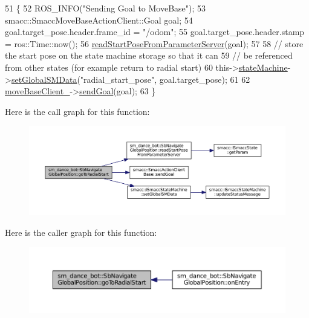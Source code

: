 \begin{DoxyCode}
51   \{
52     ROS\_INFO(\textcolor{stringliteral}{"Sending Goal to MoveBase"});
53     smacc::SmaccMoveBaseActionClient::Goal goal;
54     goal.target\_pose.header.frame\_id = \textcolor{stringliteral}{"/odom"};
55     goal.target\_pose.header.stamp = ros::Time::now();
56     \hyperlink{classsm__dance__bot_1_1SbNavigateGlobalPosition_adc268e278b7de844202959036f424a91}{readStartPoseFromParameterServer}(goal);
57 
58     \textcolor{comment}{// store the start pose on the state machine storage so that it can}
59     \textcolor{comment}{// be referenced from other states (for example return to radial start)}
60     this->\hyperlink{classsmacc_1_1SmaccSubStateBehavior_ae3ff8a316bdd4bc5b7fee59d19464609}{stateMachine}->\hyperlink{classsmacc_1_1ISmaccStateMachine_a8588f9e580fbb95b53e2bd2ca3ff1f98}{setGlobalSMData}(\textcolor{stringliteral}{"radial\_start\_pose"}, goal.target\_pose);
61 
62     \hyperlink{classsm__dance__bot_1_1SbNavigateGlobalPosition_a61ddf443ec0ccc460ae594d35c50ac7f}{moveBaseClient\_}->\hyperlink{classsmacc_1_1SmaccActionClientBase_a2ec9e5fb96ecc517a815cda209eb1b51}{sendGoal}(goal);
63   \}
\end{DoxyCode}


Here is the call graph for this function\+:
\nopagebreak
\begin{figure}[H]
\begin{center}
\leavevmode
\includegraphics[width=350pt]{classsm__dance__bot_1_1SbNavigateGlobalPosition_ab923d1e3c346506417d18f0ebbfd33ec_cgraph}
\end{center}
\end{figure}




Here is the caller graph for this function\+:
\nopagebreak
\begin{figure}[H]
\begin{center}
\leavevmode
\includegraphics[width=350pt]{classsm__dance__bot_1_1SbNavigateGlobalPosition_ab923d1e3c346506417d18f0ebbfd33ec_icgraph}
\end{center}
\end{figure}


